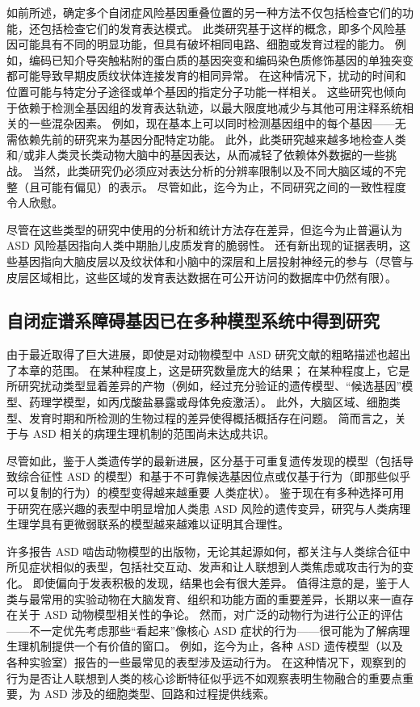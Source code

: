 如前所述，确定多个自闭症风险基因重叠位置的另一种方法不仅包括检查它们的功能，还包括检查它们的发育表达模式。 此类研究基于这样的概念，即多个风险基因可能具有不同的明显功能，但具有破坏相同电路、细胞或发育过程的能力。 例如，编码已知介导突触粘附的蛋白质的基因突变和编码染色质修饰基因的单独突变都可能导致早期皮质纹状体连接发育的相同异常。 在这种情况下，扰动的时间和位置可能与特定分子途径或单个基因的指定分子功能一样相关。 这些研究也倾向于依赖于检测全基因组的发育表达轨迹，以最大限度地减少与其他可用注释系统相关的一些混杂因素。 例如，现在基本上可以同时检测基因组中的每个基因——无需依赖先前的研究来为基因分配特定功能。 此外，此类研究越来越多地检查人类和/或非人类灵长类动物大脑中的基因表达，从而减轻了依赖体外数据的一些挑战。 当然，此类研究仍必须应对表达分析的分辨率限制以及不同大脑区域的不完整（且可能有偏见）的表示。 尽管如此，迄今为止，不同研究之间的一致性程度令人欣慰。

尽管在这些类型的研究中使用的分析和统计方法存在差异，但迄今为止普遍认为 ASD 风险基因指向人类中期胎儿皮质发育的脆弱性。 还有新出现的证据表明，这些基因指向大脑皮层以及纹状体和小脑中的深层和上层投射神经元的参与（尽管与皮层区域相比，这些区域的发育表达数据在可公开访问的数据库中仍然有限）。

\subsection{自闭症谱系障碍基因已在多种模型系统中得到研究}
由于最近取得了巨大进展，即使是对动物模型中 ASD 研究文献的粗略描述也超出了本章的范围。 在某种程度上，这是研究数量庞大的结果； 在某种程度上，它是所研究扰动类型显着差异的产物（例如，经过充分验证的遗传模型、“候选基因”模型、药理学模型，如丙戊酸盐暴露或母体免疫激活）。 此外，大脑区域、细胞类型、发育时期和所检测的生物过程的差异使得概括概括存在问题。 简而言之，关于与 ASD 相关的病理生理机制的范围尚未达成共识。

尽管如此，鉴于人类遗传学的最新进展，区分基于可重复遗传发现的模型（包括导致综合征性 ASD 的模型）和基于不可靠候选基因位点或仅基于行为（即那些似乎可以复制的行为）的模型变得越来越重要 人类症状）。 鉴于现在有多种选择可用于研究在感兴趣的表型中明显增加人类患 ASD 风险的遗传变异，研究与人类病理生理学具有更微弱联系的模型越来越难以证明其合理性。

许多报告 ASD 啮齿动物模型的出版物，无论其起源如何，都关注与人类综合征中所见症状相似的表型，包括社交互动、发声和让人联想到人类焦虑或攻击行为的变化。 即使偏向于发表积极的发现，结果也会有很大差异。 值得注意的是，鉴于人类与最常用的实验动物在大脑发育、组织和功能方面的重要差异，长期以来一直存在关于 ASD 动物模型相关性的争论。 然而，对广泛的动物行为进行公正的评估——不一定优先考虑那些“看起来”像核心 ASD 症状的行为——很可能为了解病理生理机制提供一个有价值的窗口。 例如，迄今为止，各种 ASD 遗传模型（以及各种实验室）报告的一些最常见的表型涉及运动行为。 在这种情况下，观察到的行为是否让人联想到人类的核心诊断特征似乎远不如观察表明生物融合的重要点重要，为 ASD 涉及的细胞类型、回路和过程提供线索。


